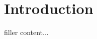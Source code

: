 \documentclass[../../templates/section]{subfiles}
\begin{document}
\section{Introduction}\label{sec:introduction}

filler content...
\end{document}
